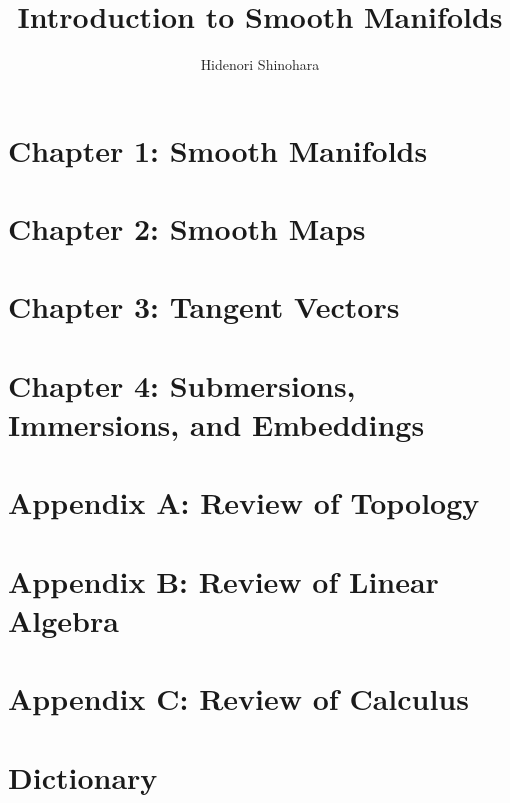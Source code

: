 \documentclass[psamsfonts]{amsart}
\theoremstyle{definition}
\theoremstyle{remar}
\numberwithin{equation}{section}
\begin{document}
\title{Introduction to Smooth Manifolds}
\author{Hidenori Shinohara}

\maketitle
\tableofcontents

\section{Chapter 1: Smooth Manifolds}


\section{Chapter 2: Smooth Maps}


\section{Chapter 3: Tangent Vectors}


\section{Chapter 4: Submersions, Immersions, and Embeddings}


\section{Appendix A: Review of Topology}


\section{Appendix B: Review of Linear Algebra}


\section{Appendix C: Review of Calculus}


\section{Dictionary}

\end{document}
